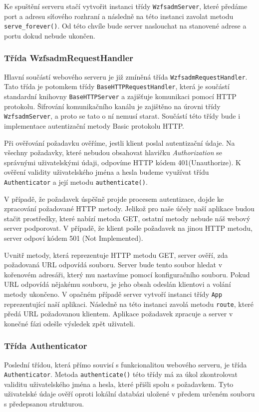     Ke spuštění serveru stačí vytvořit instanci třídy \verb|WzfsadmServer|, které předáme port a adresu síťového rozhraní a následně na této instanci zavolat metodu \verb|serve_forever()|. Od této chvíle bude server naslouchat na stanovené adrese a portu dokud nebude ukončen.
    \subsubsection{Třída WzfsadmRequestHandler}
    Hlavní součástí webového serveru je již zmíněná třída \verb|WzfsadmRequestHandler|. Tato třída je potomkem třídy \verb|BaseHTTPRequestHandler|, která je součástí standardní knihovny \verb|BaseHTTPServer| a zajišťuje komunikaci pomocí HTTP protokolu. Šifrování komunikačního kanálu je zajištěno na úrovni třídy \verb|WzfsadmServer|, a proto se tato o ní nemusí starat. Součástí této třídy bude i implementace autentizační metody Basic protokolu HTTP.

    Při ověřování požadavku ověříme, jestli klient poslal autentizační údaje. Na všechny požadavky, které nebudou obsahovat hlavičku \emph{Authorization} se správnými uživatelskými údaji, odpovíme HTTP kódem 401(Unauthorize).
    K ověření validity uživatelského jména a hesla budeme využívat třídu \verb|Authenticator| a její metodu \verb|authenticate()|.

    V případě, že požadavek úspěšně projde procesem autentizace, dojde ke zpracování požadované HTTP metody. Jelikož pro naše účely naší aplikace budou stačit prostředky, které nabízí metoda GET, ostatní metody nebude náš webový server podporovat. V případě, že klient pošle požadavek na jinou HTTP metodu, server odpoví kódem 501 (Not Implemented).

    Uvnitř metody, která reprezentuje HTTP metodu GET, server ověří, zda požadovaná URL odpovídá souboru. Server bude tento soubor hledat v kořenovém adresáři, který mu nastavíme pomocí konfiguračního souboru. Pokud URL odpovídá nějakému souboru, je jeho obsah odeslán klientovi a volání metody ukončeno. V opačném případě server vytvoří instanci třídy \verb|App| reprezentující naší aplikaci. Následně na této instanci zavolá metodu \verb|route|, které předá URL požadovanou klientem. Aplikace požadavek zpracuje a server v konečné fázi odešle výsledek zpět uživateli.
    \subsubsection{Třída Authenticator}
    Poslední třídou, která přímo souvisí s funkcionalitou webového serveru, je třída \verb|Authenticator|. Metoda \verb|authenticate()| této třídy má za úkol zkontrolovat validitu uživatelského jména a hesla, které přišli spolu s požadavkem. Tyto uživatelské údaje ověří oproti lokální databázi uložené v předem určeném souboru s předepsanou strukturou.

